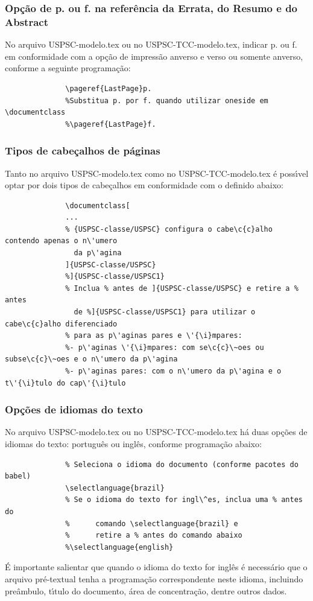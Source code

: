 \subsubsection{Op\c{c}\~ao de p. ou f. na refer\^encia da Errata, do Resumo e do Abstract} 
 No arquivo USPSC-modelo.tex ou no USPSC-TCC-modelo.tex, indicar p. ou f. em conformidade com a op\c{c}\~ao de impress\~ao anverso e verso ou somente anverso, conforme a seguinte programa\c{c}\~ao:
			  \begin{verbatim}
			  \pageref{LastPage}p. 
			  %Substitua p. por f. quando utilizar oneside em \documentclass
			  %\pageref{LastPage}f.
			  \end{verbatim}			  
\subsubsection{Tipos de cabe\c{c}alhos de p\'aginas} 
Tanto no arquivo USPSC-modelo.tex como no USPSC-TCC-modelo.tex \'e poss\'{\i}vel optar por dois tipos de cabe\c{c}alhos em conformidade com o definido abaixo:
			  \begin{verbatim}
			  \documentclass[
			  ...
			  % {USPSC-classe/USPSC} configura o cabe\c{c}alho contendo apenas o n\'umero
			    da p\'agina
			  ]{USPSC-classe/USPSC}
			  %]{USPSC-classe/USPSC1}
			  % Inclua % antes de ]{USPSC-classe/USPSC} e retire a % antes 
			    de %]{USPSC-classe/USPSC1} para utilizar o cabe\c{c}alho diferenciado
			  % para as p\'aginas pares e \'{\i}mpares: 
			  %- p\'aginas \'{\i}mpares: com se\c{c}\~oes ou subse\c{c}\~oes e o n\'umero da p\'agina
			  %- p\'aginas pares: com o n\'umero da p\'agina e o t\'{\i}tulo do cap\'{\i}tulo 
			  \end{verbatim}
\subsubsection{Op\c{c}\~oes de idiomas do texto}\label{idioma} 
No arquivo USPSC-modelo.tex ou no USPSC-TCC-modelo.tex h\'a duas op\c{c}\~oes de idiomas do texto: portugu\^es ou ingl\^es, conforme programa\c{c}\~ao abaixo:			  
			  \begin{verbatim}
			  % Seleciona o idioma do documento (conforme pacotes do babel)
			  \selectlanguage{brazil}
			  % Se o idioma do texto for ingl\^es, inclua uma % antes do 
			  %      comando \selectlanguage{brazil} e 
			  %      retire a % antes do comando abaixo
			  %\selectlanguage{english}			  
			  \end{verbatim}
\'E importante salientar que quando o idioma do texto for ingl\^es \'e necess\'ario que o arquivo pr\'e-textual tenha a programa\c{c}\~ao correspondente neste idioma, incluindo pre\^ambulo, t\'{\i}tulo do documento, \'area de concentra\c{c}\~ao, dentre outros dados.
 			  
